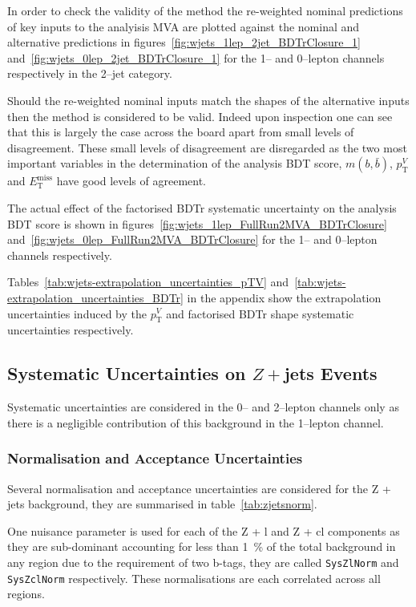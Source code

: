 In order to check the validity of the method the re-weighted nominal predictions
of key inputs to the analyisis MVA are plotted against the nominal and
alternative predictions in figures~\ref{fig:wjets_1lep_2jet_BDTrClosure_1}
and~\ref{fig:wjets_0lep_2jet_BDTrClosure_1} for the 1-- and 0--lepton channels
respectively in the 2--jet category.


Should the re-weighted nominal inputs match
the shapes of the alternative inputs then the method is considered to be valid.
Indeed upon inspection one can see that this is largely the case across the
board apart from small levels of disagreement. These small levels of
disagreement are disregarded as the two most important variables in the
determination of the analysis BDT score, $m(b, \bar{b})$, $p_{\mathrm{T}}^V$ and
$E_{\mathrm{T}}^{\text{miss}}$ have good levels of agreement.

The actual effect of the factorised BDTr systematic uncertainty on the analysis
BDT score is shown in figures~\ref{fig:wjets_1lep_FullRun2MVA_BDTrClosure}
and~\ref{fig:wjets_0lep_FullRun2MVA_BDTrClosure} for the 1-- and 0--lepton
channels respectively. 


Tables~\ref{tab:wjets-extrapolation_uncertainties_pTV}
and~\ref{tab:wjets-extrapolation_uncertainties_BDTr} in the appendix show the
extrapolation uncertainties induced by the $p_{\mathrm{T}}^V$ and factorised BDTr shape
systematic uncertainties respectively.
\clearpage
\newpage

\subsection{Systematic Uncertainties on $Z+$jets Events}
\label{sec:zjets-systs}

Systematic uncertainties are considered in the 0-- and 2--lepton channels only
as there is a negligible contribution of this background in the 1--lepton channel.

\subsubsection{Normalisation and Acceptance Uncertainties}

Several normalisation and acceptance uncertainties are considered for the Z +
jets background, they are summarised in table~\ref{tab:zjetsnorm}.

One nuisance parameter is used for each of the Z + l and Z + cl components as
they are sub-dominant accounting for less than 1~\% of the total background in
any region due to the requirement of two b-tags, they are called
\texttt{SysZlNorm} and \texttt{SysZclNorm} respectively. These normalisations
are each correlated across all regions.

